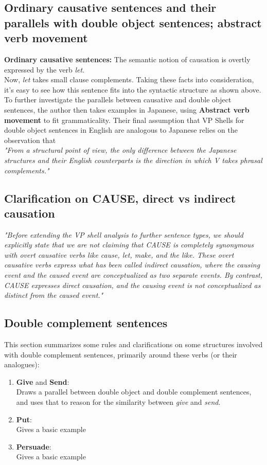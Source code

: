 \documentclass[11pt,a4paper]{article}
\begin{document}
	\subsection{Ordinary causative sentences and their parallels with double object sentences; abstract verb movement}
	\textbf{Ordinary causative sentences: } The semantic notion of causation is overtly expressed by the 
	verb \textit{let}.\\
	$ $\\
	Now, \textit{let} takes small clause complements. Taking these facts into consideration, it's easy to
	see how this sentence fits into the syntactic structure as shown above. To further investigate the parallels
	between causative and double object sentences, the author then takes examples in Japanese, using 
	\textbf{Abstract verb movement} to fit grammaticality. Their final assumption that VP Shells for double
	object sentences in English are analogous to Japanese relies on the observation that\\ \textit{"From a 
	structural point of view, the only difference between the Japanese structures and their English counterparts 
	is the direction in which V takes phrasal complements."}\\
	\subsection{Clarification on CAUSE, direct vs indirect causation}
	\textit{"Before extending the VP shell analysis to further sentence types, we should explicitly state that 
	we are not claiming that CAUSE is completely synonymous with overt causative verbs like cause, let, make, 
	and the like. These overt causative verbs express what has been called indirect causation, where the causing 
	event and the caused event are conceptualized as two separate events. By contrast, CAUSE expresses direct 
	causation, and the causing event is not conceptualized as distinct from the caused event."}\\
	\subsection{Double complement sentences}
	This section summarizes some rules and clarifications on some structures involved with double complement
	sentences, primarily around these verbs (or their analogues):\\
	\begin{enumerate}
		\item \textbf{Give} and \textbf{Send}:\\
		Draws a parallel between double object and double complement sentences, and uses that to reason for 
		the similarity between \textit{give} and \textit{send}.\\
		\item \textbf{Put}:\\
		Gives a basic example\\
		\item \textbf{Persuade}:\\
		Gives a basic example\\
	\end{enumerate}
	
\end{document}
